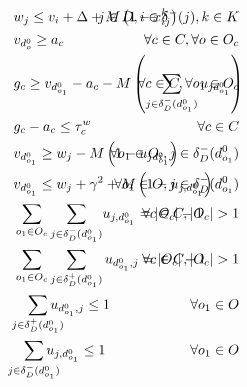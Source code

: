 \documentclass{article}
\begin{document}
\begin{alignat}{3}
    \label{mod:c7}         & w_{j} \leq v_{i}  + \Delta + M\left(1- x^{k}_{ij}\right)  & \hspace*{-40mm} j \in D,  i \in \delta^{-}(j),  k \in K \text{ }  \\
    \label{mod:c8}         & v_{d^0_{o}} \geq a_c    & \hspace{-40mm} \forall  c \in C, \forall o \in O_c \text{ }                           \\
    \label{mod:c9}          & g_{c} \geq v_{d^0_{o_1}} - a_c - M\left(  \sum_{ j \in \delta^{-}_{D}(d^0_{o_1})  }{u_{jd^0_{o_1}}}\right)  & \hspace{-40mm}  \forall  c \in C, \forall o_1 \in O_c \text{ }  \\
    \label{mod:c91}  & g_{c} - a_c \leq \tau^w_c  & \hspace{-20mm}  \forall  c \in C \text{ }   \\
    \label{mod:c101}       & v_{d^0_{o_1}} \geq w_j - M\left(1- u_{jd^0_{o_1}}\right)   & \hspace{-50mm}    \forall o_1 \in O_i,  j \in \delta_{D}^{-}(d^0_{o_1}) \text{ }                \\
    \label{mod:c10}        & v_{d^0_{o_1}}  \leq  w_j + \gamma^2 + M\left(1- u_{j,d^0_{o_1}}\right)     & \hspace{-40mm}  \forall  o_1 \in O,  j \in \delta_{D}^{-}(d^0_{o_1}) \text{ }                    \\
    \label{mod:c11}        & \sum_{ \substack{o_1 \in O_c }}{ \sum_{ j \in \delta^{-}_{D}(d^0_{o_1})}}{u_{j,d^0_{o_1} } } = |O_c|-1      & \hspace{-40mm} \forall  c \in C,|O_c| > 1   \text{ }   \\
    \label{mod:c12}        & \sum_{ \substack{o_1 \in O_c }}\sum_{ j \in \delta^{+}_{D}(d^0_{o_1})}{u_{d^0_{o_1},j } } = |O_c|-1      & \hspace{-40mm} \forall  c \in C, |O_c| > 1  \text{ }          \\
    \label{mod:c13}    & \hspace{3mm} \smashoperator{ \sum_{ j \in \delta^{+}_{D}(d^0_{o_1})}}{u_{d^0_{o_1},j } } \leq 1    & \hspace{-20mm}  \forall o_1 \in O \text{ }         \\
    \label{mod:c14}        & \hspace{2mm} \smashoperator{ \sum_{ j \in \delta^{-}_{D}(d^0_{o_1})}}{u_{j,d^0_{o_1} } } \leq 1      & \hspace{-20mm} \forall o_1 \in O \text{ }        \\

\end{alignat}
\end{document}
